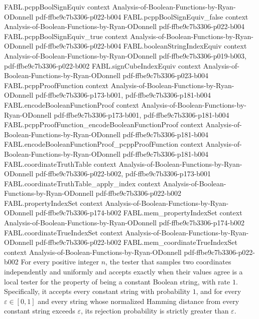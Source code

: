 \begin{theorem}
\proofstep
  {FABL.pcppBoolSignEquiv}
  {context}
  {Analysis-of-Boolean-Functions-by-Ryan-ODonnell}
  {pdf-ffbe9c7b3306-p022-b004}
\proofstep
  {FABL.pcppBoolSignEquiv_false}
  {context}
  {Analysis-of-Boolean-Functions-by-Ryan-ODonnell}
  {pdf-ffbe9c7b3306-p022-b004}
\proofstep
  {FABL.pcppBoolSignEquiv_true}
  {context}
  {Analysis-of-Boolean-Functions-by-Ryan-ODonnell}
  {pdf-ffbe9c7b3306-p022-b004}
\proofstep
  {FABL.booleanStringIndexEquiv}
  {context}
  {Analysis-of-Boolean-Functions-by-Ryan-ODonnell}
  {pdf-ffbe9c7b3306-p019-b003,
    pdf-ffbe9c7b3306-p022-b002}
\proofstep
  {FABL.signCubeIndexEquiv}
  {context}
  {Analysis-of-Boolean-Functions-by-Ryan-ODonnell}
  {pdf-ffbe9c7b3306-p023-b004}
\proofstep
  {FABL.pcppProofFunction}
  {context}
  {Analysis-of-Boolean-Functions-by-Ryan-ODonnell}
  {pdf-ffbe9c7b3306-p173-b001,
    pdf-ffbe9c7b3306-p181-b004}
\proofstep
  {FABL.encodeBooleanFunctionProof}
  {context}
  {Analysis-of-Boolean-Functions-by-Ryan-ODonnell}
  {pdf-ffbe9c7b3306-p173-b001,
    pdf-ffbe9c7b3306-p181-b004}
\proofstep
  {FABL.pcppProofFunction_encodeBooleanFunctionProof}
  {context}
  {Analysis-of-Boolean-Functions-by-Ryan-ODonnell}
  {pdf-ffbe9c7b3306-p181-b004}
\proofstep
  {FABL.encodeBooleanFunctionProof_pcppProofFunction}
  {context}
  {Analysis-of-Boolean-Functions-by-Ryan-ODonnell}
  {pdf-ffbe9c7b3306-p181-b004}
\proofstep
  {FABL.coordinateTruthTable}
  {context}
  {Analysis-of-Boolean-Functions-by-Ryan-ODonnell}
  {pdf-ffbe9c7b3306-p022-b002,
    pdf-ffbe9c7b3306-p173-b001}
\proofstep
  {FABL.coordinateTruthTable_apply_index}
  {context}
  {Analysis-of-Boolean-Functions-by-Ryan-ODonnell}
  {pdf-ffbe9c7b3306-p022-b002}
\proofstep
  {FABL.propertyIndexSet}
  {context}
  {Analysis-of-Boolean-Functions-by-Ryan-ODonnell}
  {pdf-ffbe9c7b3306-p174-b002}
\proofstep
  {FABL.mem_propertyIndexSet}
  {context}
  {Analysis-of-Boolean-Functions-by-Ryan-ODonnell}
  {pdf-ffbe9c7b3306-p174-b002}
\proofstep
  {FABL.coordinateTrueIndexSet}
  {context}
  {Analysis-of-Boolean-Functions-by-Ryan-ODonnell}
  {pdf-ffbe9c7b3306-p022-b002}
\proofstep
  {FABL.mem_coordinateTrueIndexSet}
  {context}
  {Analysis-of-Boolean-Functions-by-Ryan-ODonnell}
  {pdf-ffbe9c7b3306-p022-b002}
For every positive integer $n$, the tester that samples two coordinates independently
and uniformly and accepts exactly when their values agree is a local tester for the
property of being a constant Boolean string, with rate $1$. Specifically, it accepts
every constant string with probability $1$, and for every $\varepsilon\in[0,1]$ and
every string whose normalized Hamming distance from every constant string exceeds
$\varepsilon$, its rejection probability is strictly greater than $\varepsilon$.
\end{theorem}

